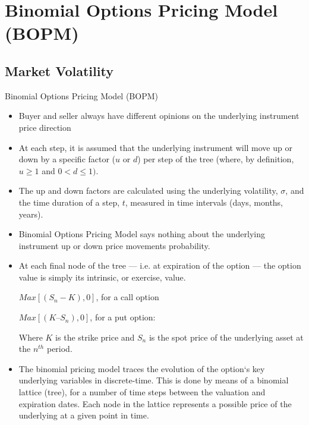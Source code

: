 \documentclass[_international_finance_p1.tex]{subfiles}
\begin{document}
\section{Binomial Options Pricing Model (BOPM)}
\subsection{Market Volatility}
\begin{frame}{Binomial Options Pricing Model (BOPM)}
\begin{itemize}[<+->]
\item
Buyer and seller always have different opinions on the underlying instrument price direction
\item
At each step, it is assumed that the underlying instrument will move up or down by a specific factor ($u$ or $d$) per step of the tree (where, by definition, $u \ge 1$ and $0 < d \le 1 )$.
\item
The up and down factors are calculated using the underlying volatility, $\sigma$, and the time duration of a step, $t$, measured in time intervals (days, months, years).
\item
Binomial Options Pricing Model says nothing about the underlying instrument up or down price movements probability.
\end{itemize}
\end{frame}
\begin{frame}{}
\begin{itemize}[<+->]
\item
At each final node of the tree — i.e. at expiration of the option — the option value is simply its intrinsic, or exercise, value.

    $Max [ (S_n-K), 0 ]$, for a call option
    
    $Max [ (K – S_n), 0 ]$, for a put option:

Where $K$ is the strike price and $S_n$ is the spot price of the underlying asset at the $n^{th}$ period. 
\item
The binomial pricing model traces the evolution of the option`s key underlying variables in discrete-time. This is done by means of a binomial lattice (tree), for a number of time steps between the valuation and expiration dates. Each node in the lattice represents a possible price of the underlying at a given point in time.
\end{itemize}
\end{frame}
\end{document}
